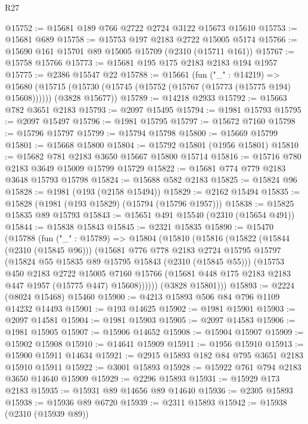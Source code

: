 \begin{lexlean}{R27}
\begin{coremodule}
@15752 := @15681 @189 @766 @2722 @2724 @3122 @15673 @15610
@15753 := @15681 @689
@15758 := @15753 @197 @2183 @2722 @15005 @5174
@15766 := @15690 @161 @15701 @89 @15005 @15709 (@2310 (@15711 @161))
@15767 := @15758 @15766
@15773 := @15681 @195 @175 @2183 @2183 @194 @1957
@15775 := @2386 @15547 @22
@15788 := @15661
    (fun ("_" : @14219) =>
    @15680
      (@15715 (@15730 (@15745 (@15752 (@15767 (@15773 (@15775 @194) @15608))))))
      (@3828 @15677))
@15789 := @14218 @2933
@15792 := @15663 @782 @3651 @2183
@15793 := @2097 @15495
@15794 := @1981 @15793
@15795 := @2097 @15497
@15796 := @1981 @15795
@15797 := @15672 @7160
@15798 := @15796 @15797
@15799 := @15794 @15798
@15800 := @15669 @15799
@15801 := @15668 @15800
@15804 := @15792 @15801 (@1956 @15801)
@15810 := @15682 @781 @2183 @3650 @15667 @15800 @15714
@15816 := @15716 @780 @2183 @3649 @15009 @15799 @15729
@15822 := @15681 @774 @779 @2183 @3648 @15793 @15798
@15824 := @15688 @582 @2183
@15825 := @15824 @96
@15828 := @1981 (@193 (@2158 @15494))
@15829 := @2162 @15494
@15835 := @15828 (@1981 (@193 @15829) (@15794 (@15796 @1957)))
@15838 := @15825 @15835 @89 @15793
@15843 := @15651 @491 @15540 (@2310 (@15654 @491))
@15844 := @15838 @15843
@15845 := @2321 @15835
@15890 := @15470
    (@15788
      (fun ("_" : @15789) =>
      @15804
        (@15810
          (@15816
            (@15822
              (@15844 (@2310 (@15845 @96)))
              (@15681
                @776
                @778
                @2183
                @2724
                @15795
                @15797
                (@15824 @55 @15835 @89 @15795 @15843 (@2310 (@15845 @55)))
                (@15753
                  @450
                  @2183
                  @2722
                  @15005
                  @7160
                  @15766
                  (@15681 @448 @175 @2183 @2183 @447 @1957 (@15775 @447) @15608))))))
        (@3828 @15801)))
@15893 := @2224 (@8024 @15468) @15460
@15900 := @4213 @15893 @506 @84 @796 @1109 @14232 @14493
@15901 := @193 @14625
@15902 := @1981 @15901
@15903 := @2097 @14581
@15904 := @1981 @15903
@15905 := @2097 @14583
@15906 := @1981 @15905
@15907 := @15906 @14652
@15908 := @15904 @15907
@15909 := @15902 @15908
@15910 := @14641 @15909
@15911 := @1956 @15910
@15913 := @15900 @15911 @14634
@15921 := @2915 @15893 @182 @84 @795 @3651 @2183 @15910 @15911
@15922 := @3001 @15893
@15928 := @15922 @761 @794 @2183 @3650 @14640 @15909
@15929 := @2296 @15893
@15931 := @15929 @173 @2183
@15935 := @15931 @89 @14656 @89 @14640
@15936 := @2305 @15893
@15938 := @15936 @89 @6720
@15939 := @2311 @15893
@15942 := @15938 (@2310 (@15939 @89))

\end{coremodule}
\end{lexlean}
